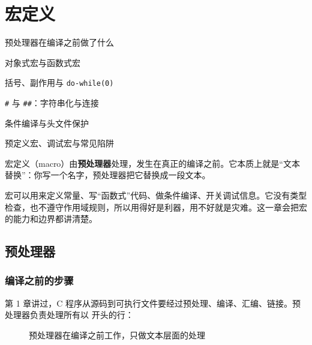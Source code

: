 \chapter{宏定义}

\begin{introduction}
  \item 预处理器在编译之前做了什么
  \item 对象式宏与函数式宏
  \item 括号、副作用与 \texttt{do-while(0)}
  \item \texttt{\#} 与 \texttt{\#\#}：字符串化与连接
  \item 条件编译与头文件保护
  \item 预定义宏、调试宏与常见陷阱
\end{introduction}


宏定义（macro）由\textbf{预处理器}处理，发生在真正的编译之前。它本质上就是“文本替换”：你写一个名字，预处理器把它替换成一段文本。

宏可以用来定义常量、写“函数式”代码、做条件编译、开关调试信息。它没有类型检查，也不遵守作用域规则，所以用得好是利器，用不好就是灾难。这一章会把宏的能力和边界都讲清楚。

\section{预处理器}

\subsection{编译之前的步骤}

第 1 章讲过，C 程序从源码到可执行文件要经过预处理、编译、汇编、链接。预处理器负责处理所有以 \code{#} 开头的行：

\begin{figure}[htbp]
  \centering
  \caption{预处理器在编译之前工作，只做文本层面的处理}
  \label{fig:preprocess}
\end{figure}

